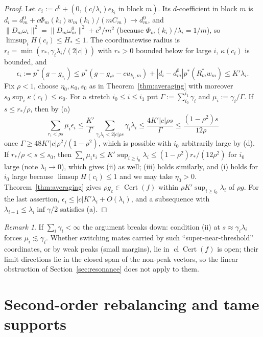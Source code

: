 \documentclass[10pt]{amsart}
\theoremstyle{definition}
\theoremstyle{remark}
\newtheorem{remark}[theorem]{Remark}
\newcommand{\Cert}{\operatorname{Cert}}
\newcommand{\cl}{\operatorname{cl}}
\begin{document}
\begin{proof}
Let $c_i:=c^0+(0,(c/\lambda_i)e_{k_i}\text{ in block }m)$.  Its
$d$-coefficient in block $m$ is $d_{i}=d^0_m+c\Phi_m(k_i)w_m(k_i)/(mC_m)
\to d^0_m$, and $\|D_m\omega_{i}\|^2=\|D_m\omega^0_m\|^2+c^2/m^2$ (because
$\Phi_m(k_i)/\lambda_i=1/m$), so $\limsup_iH(c_i)\le H_*\le1$.  The
coordinatewise radius is $r_i=\min(r_*,\gamma_i\lambda_i/(2|c|))$ with
$r_*>0$ bounded below for large $i$, $\kappa(c_i)$ is bounded, and
\[
 \epsilon_i:=p^*(g-g_{c_i})\le p^*(g-g_{c^0}-cu_{k_i,m})+|d_i-d^0_m|p^*(R_m^*w_m)
 \le K'\lambda_i .
\]
Fix $\rho<1$, choose $\eta_0,\kappa_0,s_0$ as in Theorem~\ref{thm:averaging}
with moreover $s_0\sup_i\kappa(c_i)\le\kappa_0$.  For a stretch
$i_0\le i\le i_1$ put $\Gamma:=\sum_{i_0}^{i_1}\gamma_i$ and
$\mu_i:=\gamma_i/\Gamma$.  If $s\le r_*/\rho$, then by (a)
\[
 \sum_{r_i<\rho s}\mu_i\epsilon_i\le\frac{K'}{\Gamma}\sum_{\gamma_i\lambda_i<2|c|\rho
 s}\gamma_i\lambda_i\le\frac{4K'|c|\rho s}{\Gamma}\le\frac{(1-\rho^2)s}
 {12\rho}
\]
once $\Gamma\ge48K'|c|\rho^2/(1-\rho^2)$, which is possible with $i_0$
arbitrarily large by (d).  If $r_*/\rho<s\le s_0$, then
$\sum_i\mu_i\epsilon_i\le K'\sup_{i\ge i_0}\lambda_i\le(1-\rho^2)r_*/(12\rho^2)$
for $i_0$ large (note $\lambda_i\to0$), which gives (ii) as well; (iii) holds similarly, and (i) holds for
$i_0$ large because $\limsup H(c_i)\le1$ and we may take $\eta_0>0$.
Theorem~\ref{thm:averaging} gives $\rho g_c\in\Cert(f)$ within
$\rho K'\sup_{i\ge i_0}\lambda_i$ of $\rho g$.  For the last assertion,
$\epsilon_i\le|c|K'\lambda_i+O(\lambda_i)$, and a subsequence with
$\lambda_{i+1}\le\lambda_i\inf\gamma/2$ satisfies (a).
\end{proof}

\begin{remark}\label{rem:summablegaps}
If $\sum_i\gamma_i<\infty$ the argument breaks down: condition (ii) at
$s\approx\gamma_i\lambda_i$ forces $\mu_i\lesssim\gamma_i$.  Whether
switching mates carried by such ``super-near-threshold'' coordinates, or by
weak peaks (small margins), lie in $\cl\Cert(f)$ is open; their limit
directions lie in the closed span of the non-peak vectors, so the linear
obstruction of Section~\ref{sec:resonance} does not apply to them.
\end{remark}

\section{Second-order rebalancing and tame supports}\label{sec:second}
\end{document}
